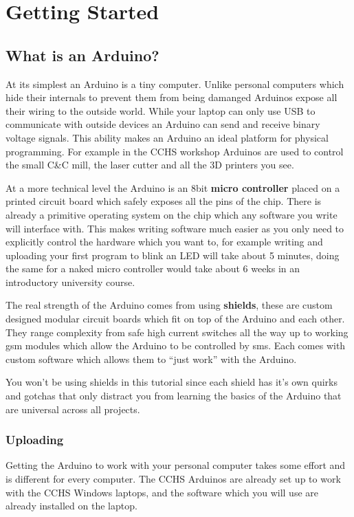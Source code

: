 \chapter{Getting Started}

\section{What is an Arduino?}

At its simplest an Arduino is a tiny computer.
Unlike personal computers which hide their internals to prevent them from being damanged
Arduinos expose all their wiring to the outside world.
While your laptop can only use USB to communicate with outside devices
an Arduino can send and receive binary voltage signals.
This ability makes an Arduino an ideal platform for physical programming.
For example in the CCHS workshop Arduinos are used to control the small C\&C mill, the laser cutter and all the 3D printers you see.

At a more technical level the Arduino is an 8bit \textbf{micro controller} 
placed on a printed circuit board which safely exposes all the pins of the chip. 
There is already a primitive operating system on the chip which any software you write will interface with.
This makes writing software much easier as you only need to explicitly control the hardware which you want to,
for example writing and uploading your first program 
to blink an LED 
will take about 5 minutes,
doing the same for a naked micro controller would take about 6 weeks in an introductory university course.

The real strength of the Arduino comes from using \textbf{shields},
these are custom designed modular circuit boards which fit on top of the Arduino
and each other.
They range complexity from safe high current switches all the way up to working gsm modules which allow the Arduino to be controlled by sms.
Each comes with custom software which allows them to ``just work'' with the Arduino.

You won't be using shields in this tutorial since each shield has it's own quirks and gotchas that only distract you from learning the basics of the Arduino that are universal across all projects.


\subsection{Uploading}
Getting the Arduino to work with your personal computer takes some effort and is different for every computer.
The CCHS Arduinos are already set up to work with the CCHS Windows laptops,
and the software which you will use are already installed on the laptop.

